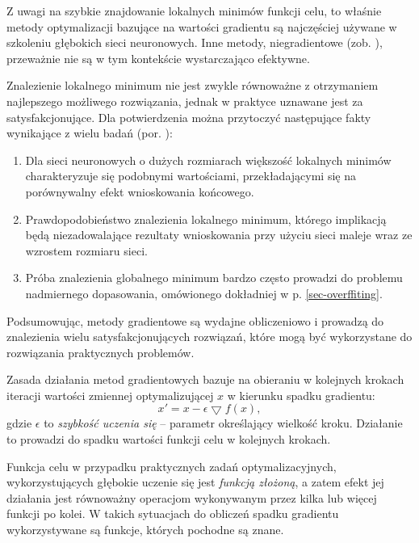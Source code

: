 Z uwagi na szybkie znajdowanie lokalnych minimów funkcji celu, to właśnie metody optymalizacji bazujące na wartości gradientu są najczęściej używane w szkoleniu głębokich sieci neuronowych. Inne metody, niegradientowe (zob. \cite{DBLP:journals/corr/TaylorBXSPG16}), przeważnie nie są w tym kontekście wystarczająco efektywne. 

Znalezienie lokalnego minimum nie jest zwykle równoważne z otrzymaniem najlepszego możliwego rozwiązania, jednak w praktyce uznawane jest za satysfakcjonujące. Dla potwierdzenia można przytoczyć następujące fakty wynikające z wielu badań (por. \cite{DBLP:journals/corr/ChoromanskaHMAL14}):
\begin{enumerate}
	\item Dla sieci neuronowych o dużych rozmiarach większość lokalnych minimów charakteryzuje się podobnymi wartościami, przekładającymi się na porównywalny efekt wnioskowania końcowego.
	\item Prawdopodobieństwo znalezienia lokalnego minimum, którego implikacją będą niezadowalające rezultaty wnioskowania przy użyciu sieci maleje wraz \linebreak ze wzrostem rozmiaru sieci.
	\item Próba znalezienia globalnego minimum bardzo często prowadzi do problemu nadmiernego dopasowania, omówionego dokładniej w p. \ref{sec-overffiting}.
\end{enumerate}

Podsumowując, metody gradientowe są wydajne obliczeniowo i prowadzą do znalezienia wielu satysfakcjonujących rozwiązań, które mogą być wykorzystane do rozwiązania praktycznych problemów. 

Zasada działania metod gradientowych bazuje na obieraniu w kolejnych krokach iteracji wartości zmiennej optymalizującej $x$ w kierunku spadku gradientu:
\begin{equation}
x' = x - \epsilon \bigtriangledown f(x),
\end{equation} 
gdzie $\epsilon$ to \textit{szybkość uczenia się} -- parametr określający wielkość kroku. Działanie to prowadzi do spadku wartości funkcji celu w kolejnych krokach. 

Funkcja celu w przypadku praktycznych zadań optymalizacyjnych, wykorzystujących głębokie uczenie się jest \textit{funkcją złożoną}, a zatem efekt jej działania jest równoważny operacjom wykonywanym przez kilka lub więcej funkcji po kolei. \linebreak W takich sytuacjach do obliczeń spadku gradientu wykorzystywane są funkcje, których pochodne są znane.

